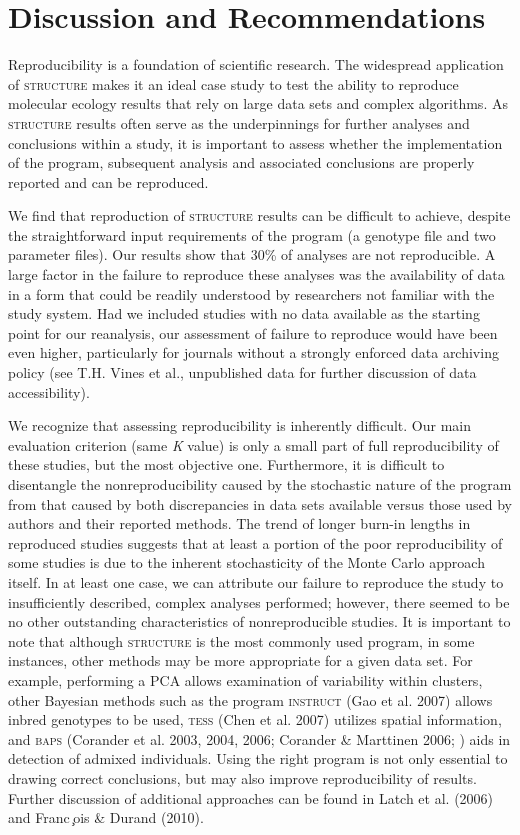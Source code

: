 \section{Discussion and Recommendations}
Reproducibility is a foundation of scientific research. The widespread application of \textsc{structure} makes it an ideal case study to test the ability to reproduce molecular ecology results that rely on large data sets and complex algorithms. As \textsc{structure} results often serve as the underpinnings for further analyses and conclusions within a study, it is important to assess whether the implementation of the program, subsequent analysis and associated conclusions are properly reported and can be reproduced.

We find that reproduction of \textsc{structure} results can be difficult to achieve, despite the straightforward input requirements of the program (a genotype file and two parameter files). Our results show that 30\% of analyses are not reproducible. A large factor in the failure to reproduce these analyses was the availability of data in a form that could be readily understood by researchers not familiar with the study system. Had we included studies with no data available as the starting point for our reanalysis, our assessment of failure to reproduce would have been even higher, particularly for journals without a strongly enforced data archiving policy (see T.H. Vines et al., unpublished data for further discussion of data accessibility).

We recognize that assessing reproducibility is inherently difficult. Our main evaluation criterion (same \emph{K} value) is only a small part of full reproducibility of these studies, but the most objective one. Furthermore, it is difficult to disentangle the nonreproducibility caused by the stochastic nature of the program from that caused by both discrepancies in data sets available versus those used by authors and their reported methods. The trend of longer burn-in lengths in reproduced studies suggests that at least a portion of the poor reproducibility of some studies is due to the inherent stochasticity of the Monte Carlo approach itself. In at least one case, we can attribute our failure to reproduce the study to insufficiently described, complex analyses performed; however, there seemed to be no other outstanding characteristics of nonreproducible studies. It is important to note that although \textsc{structure} is the most commonly used program, in some instances, other methods
may be more appropriate for a given data set. For example, performing a PCA allows examination of variability within clusters, other Bayesian methods such as the program \textsc{instruct} (Gao et al. 2007) allows inbred genotypes to be used, \textsc{tess} (Chen et al. 2007) utilizes spatial information, and \textsc{baps} (Corander et al. 2003, 2004, 2006; Corander \& Marttinen 2006; ) aids in detection of admixed individuals. Using the right program is not only essential to drawing correct conclusions, but may also improve reproducibility of results. Further discussion of additional approaches can be found in Latch et al. (2006) and Franc ̧ois \& Durand (2010).

